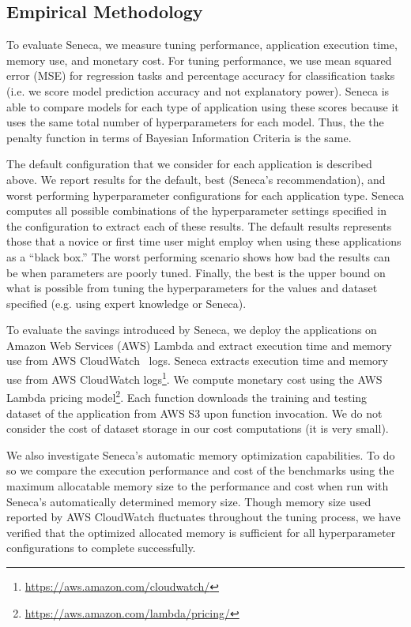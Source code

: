 \subsection{Empirical Methodology}

To evaluate Seneca, we measure tuning performance, application execution time, 
memory use, and monetary cost.  For tuning performance, 
we use mean squared error (MSE)
for regression tasks and percentage accuracy for classification 
tasks (i.e. we score model prediction accuracy and not explanatory power).  
Seneca is able to compare models for each type of application using 
these scores because it uses the same
total number of hyperparameters for each model.  Thus, the
the penalty function in terms of 
Bayesian Information Criteria is the same. 

The default configuration that we consider for each application is described
above.  We report results for the default, best (Seneca's recommendation), and
worst performing hyperparameter configurations for each application type.  
Seneca computes all possible combinations of
the hyperparameter settings specified in the configuration to extract each of
these results.  The default results represents those that a novice or first
time user might employ when using these applications as a ``black box.''  The
worst performing scenario shows how bad the results can be when parameters are
poorly tuned.  Finally, the best is the upper bound on what is possible from
tuning the hyperparameters for the values and dataset specified 
(e.g. using expert knowledge or Seneca). 

To evaluate the  savings introduced by Seneca, we deploy the applications
on Amazon Web Services (AWS) Lambda and extract
execution time and memory use from AWS CloudWatch~\cite{ref:awscloudwatch} logs.  
Seneca extracts execution time and memory use from AWS CloudWatch logs\footnote{\url{https://aws.amazon.com/cloudwatch/}}.
We compute monetary cost
using the AWS Lambda pricing model\footnote{\url{https://aws.amazon.com/lambda/pricing/}}.
Each function downloads the training and testing dataset 
of the application from AWS S3 upon function invocation. 
We do not consider the cost of dataset storage 
in our cost computations (it is very small).

We also investigate Seneca's automatic memory optimization capabilities.  To
do so we compare the execution performance and cost of the benchmarks using
the maximum allocatable memory size to the performance and cost when run with
Seneca's automatically determined memory size. Though memory size used reported by AWS CloudWatch fluctuates throughout the tuning process, we 
have verified that the optimized allocated memory is sufficient for all 
hyperparameter configurations to complete successfully.

